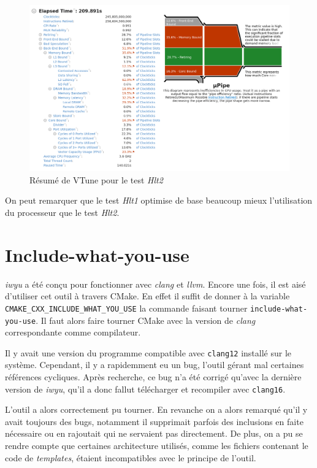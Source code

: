 \documentclass[a4paper]{report}
\begin{document}
            \begin{figure}[H]
                \includegraphics[width=\textwidth, center]{vtune_hlt2.png}
                \caption{Résumé de VTune pour le test \emph{Hlt2}}
                \label{vtune_hlt2}
            \end{figure}

            On peut remarquer que le test \emph{Hlt1} optimise de base beaucoup mieux l'utilisation du processeur que le test \emph{Hlt2}.

    \section{Include-what-you-use}
        \emph{iwyu} a été conçu pour fonctionner avec \emph{clang} et \emph{llvm}.
        Encore une fois, il est aisé d'utiliser cet outil à travers CMake.
        En effet il suffit de donner à la variable \verb'CMAKE_CXX_INCLUDE_WHAT_YOU_USE' la commande faisant tourner \verb'include-what-you-use'.
        Il faut alors faire tourner CMake avec la version de \emph{clang} correspondante comme compilateur.

        Il y avait une version du programme compatible avec \verb'clang12' installé sur le système.
        Cependant, il y a rapidemment eu un bug, l'outil gérant mal certaines références cycliques.
        Après recherche, ce bug n'a été corrigé qu'avec la dernière version de \emph{iwyu}, qu'il a donc fallut télécharger et recompiler avec \verb'clang16'.

        L'outil a alors correctement pu tourner.
        En revanche on a alors remarqué qu'il y avait toujours des bugs, notamment il supprimait parfois des inclusions en faite nécessaire ou en rajoutait qui ne servaient pas directement.
        De plus, on a pu se rendre compte que certaines architecture utilisés, comme les fichiers contenant le code de \emph{templates}, étaient incompatibles avec le principe de l'outil.
\end{document}

